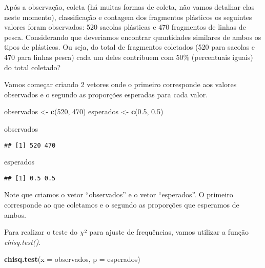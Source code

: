\documentclass[titlepage, oneside, openany, a4paper]{book}
\newenvironment{Shaded}{\begin{snugshade}}{\end{snugshade}}
\newcommand{\DataTypeTok}[1]{\textcolor[rgb]{0.13,0.29,0.53}{#1}}
\newcommand{\DecValTok}[1]{\textcolor[rgb]{0.00,0.00,0.81}{#1}}
\newcommand{\FloatTok}[1]{\textcolor[rgb]{0.00,0.00,0.81}{#1}}
\newcommand{\KeywordTok}[1]{\textcolor[rgb]{0.13,0.29,0.53}{\textbf{#1}}}
\newcommand{\NormalTok}[1]{#1}
\newcommand{\StringTok}[1]{\textcolor[rgb]{0.31,0.60,0.02}{#1}}
\begin{document}
Após a observação, coleta (há muitas formas de coleta, não vamos detalhar elas neste momento), classificação e contagem dos fragmentos plásticos os seguintes valores foram observados: 520 sacolas plásticas e 470 fragmentos de linhas de pesca. Considerando que deveriamos encontrar quantidades similares de ambos os tipos de plásticos. Ou seja, do total de fragmentos coletados (520 para sacolas e 470 para linhas pesca) cada um deles contribuem com 50\% (percentuais iguais) do total coletado?

Vamos começar criando 2 vetores onde o primeiro corresponde aos valores observados e o segundo as proporções esperadas para cada valor.

\begin{Shaded}
\begin{Highlighting}[]
\NormalTok{observados <-}\StringTok{ }\KeywordTok{c}\NormalTok{(}\DecValTok{520}\NormalTok{, }\DecValTok{470}\NormalTok{)}
\NormalTok{esperados <-}\StringTok{ }\KeywordTok{c}\NormalTok{(}\FloatTok{0.5}\NormalTok{, }\FloatTok{0.5}\NormalTok{)}

\NormalTok{observados}
\end{Highlighting}
\end{Shaded}

\begin{verbatim}
## [1] 520 470
\end{verbatim}

\begin{Shaded}
\begin{Highlighting}[]
\NormalTok{esperados}
\end{Highlighting}
\end{Shaded}

\begin{verbatim}
## [1] 0.5 0.5
\end{verbatim}

Note que criamos o vetor ``observados'' e o vetor ``esperados''. O primeiro corresponde ao que coletamos e o segundo as proporções que esperamos de ambos.

Para realizar o teste do \(\chi\)² para ajuste de frequências, vamos utilizar a função \emph{chisq.test()}.

\begin{Shaded}
\begin{Highlighting}[]
\KeywordTok{chisq.test}\NormalTok{(}\DataTypeTok{x =}\NormalTok{ observados, }\DataTypeTok{p =}\NormalTok{ esperados)}
\end{Highlighting}
\end{Shaded}
\end{document}
